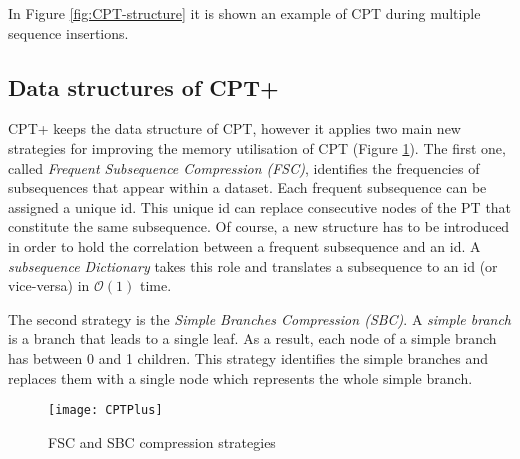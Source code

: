 In Figure \ref{fig:CPT-structure} it is shown an example of CPT during multiple sequence insertions.

\subsection{Data structures of CPT+}
CPT+ keeps the data structure of CPT, however it applies two main new strategies for improving the memory utilisation of CPT \cite{gueniche_fournier-viger_raman_tseng_2015} (Figure \ref{fig:CPTPlus}). The first one, called \emph{Frequent Subsequence Compression (FSC)}, identifies the frequencies of subsequences that appear within a dataset. Each frequent subsequence can be assigned a unique id. This unique id can replace consecutive nodes of the PT that constitute the same subsequence. Of course, a new structure has to be introduced in order to hold the correlation between a frequent subsequence and an id. A \emph{subsequence Dictionary} takes this role and translates a subsequence to an id (or vice-versa) in \(\mathcal{O}(1)\) time. 
\par The second strategy is the \emph{Simple Branches Compression (SBC)}. A \emph{simple branch} is a branch that leads to a single leaf. As a result, each node of a simple branch has between 0 and 1 children. This strategy identifies the simple branches and replaces them with a single node which represents the whole simple branch.

\begin{figure}[h]
    \centering
    \texttt{[image: CPTPlus]}
    \caption{FSC and SBC compression strategies}
    \label{fig:CPTPlus}
\end{figure}

